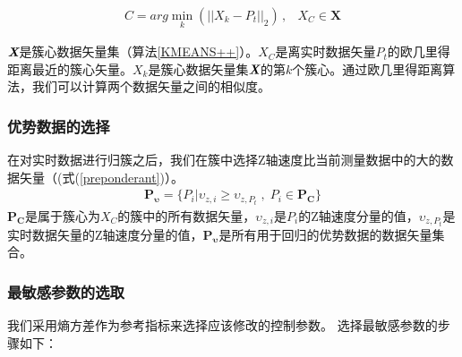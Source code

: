 \begin{eqnarray}\label{cluster}
C=arg\min \limits_{k}{(||X_{k}-P_{t}||_{2})} \, ,&X_{C}\in \bm{X}
\end{eqnarray}

$\textit{\textbf{X}}$是簇心数据矢量集（算法\ref{KMEANS++}）。$X_{C}$是离实时数据矢量$P_t$的欧几里得距离最近的簇心矢量。$X_{k}$是簇心数据矢量集$\textit{\textbf{X}}$的第$k$个簇心。通过欧几里得距离算法，我们可以计算两个数据矢量之间的相似度。

\subsubsection{优势数据的选择}
在对实时数据进行归簇之后，我们在簇中选择Z轴速度比当前测量数据中的大的数据矢量（(式(\ref{preponderant})）。
\begin{eqnarray}\label{preponderant}
\bm{P_{\upsilon}}=\{P_{i} | \upsilon_{z,i}\geq \upsilon_{z,P_{t}} \; , \; P_{i}\in \bm{P_{C}}\}
\end{eqnarray}
$\bm{P_{C}}$是属于簇心为$X_{C}$的簇中的所有数据矢量，$\upsilon_{z,i}$是$P_{i}$的Z轴速度分量的值，$\upsilon_{z,P_{t}}$是实时数据矢量的Z轴速度分量的值，$\bm{P_{\upsilon}}$是所有用于回归的优势数据的数据矢量集合。

\subsubsection{最敏感参数的选取}
我们采用熵方差作为参考指标来选择应该修改的控制参数。 选择最敏感参数的步骤如下：

